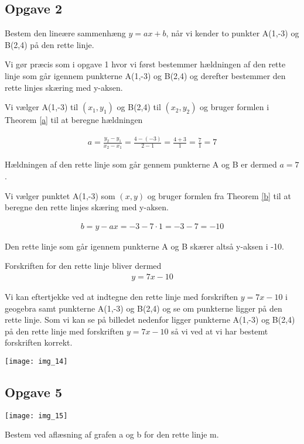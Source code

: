 \subsection{Opgave 2}
Bestem den lineære sammenhæng $y=ax+ b$, når vi kender to punkter A(1,-3) og B(2,4) på den rette linje.

Vi gør præcis som i opgave 1 hvor vi først bestemmer hældningen af den rette linje som går igennem punkterne A(1,-3) og B(2,4) og derefter bestemmer den rette linjes skæring med y-aksen.

Vi vælger A(1,-3) til $(x_1,y_1)$ og B(2,4) til $(x_2,y_2)$ og bruger formlen i Theorem \ref{a} til at beregne hældningen

\begin{align*}
a = \frac{y_2-y_1}{x_2-x_1} = \frac{4-(-3)}{2-1} = \frac{4+3}{1} = \frac{7}{1} = 7
\end{align*}

Hældningen af den rette linje som går gennem punkterne A og B er dermed $a = 7$.

Vi vælger punktet A(1,-3) som $(x,y)$ og bruger formlen fra Theorem \ref{b} til at beregne den rette linjes skæring med y-aksen.

\begin{align*}
b = y-ax = -3 - 7\cdot 1 = -3-7 = -10
\end{align*}

Den rette linje som går igennem punkterne A og B skærer altså y-aksen i -10.

Forskriften for den rette linje bliver dermed 
\begin{align*}
y = 7x-10
\end{align*}

Vi kan eftertjekke ved at indtegne den rette linje med forskriften $y = 7x-10$ i geogebra samt punkterne A(1,-3) og B(2,4) og se om punkterne ligger på den rette linje. Som vi kan se på billedet nedenfor ligger punkterne A(1,-3) og B(2,4) på den rette linje med forskriften $y = 7x-10$ så vi ved at vi har bestemt forskriften korrekt.

\texttt{[image: img\_14]}



\subsection{Opgave 5}
\texttt{[image: img\_15]}

Bestem ved aflæsning af grafen a og b for den rette linje m.

